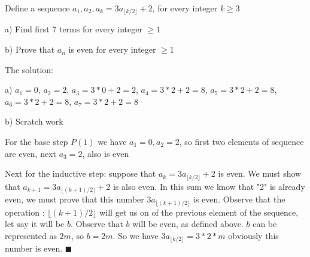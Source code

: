 \documentclass[11pt]{article}
\begin{document}
	
Define a sequence $a_1, a_2, a_k = 3a_{\lfloor k/2 \rfloor} + 2$, for every integer $k \ge 3$

a) Find first 7 terms for every integer $\ge 1$

b) Prove that $a_n$ is even for every integer $\ge 1$

The solution:

a) $a_1 = 0$, $a_2 = 2$, $a_3 = 3*0 + 2 = 2$, $a_4 = 3 * 2 + 2 = 8$, $a_5 = 3*2 + 2 = 8$,
$a_6 = 3*2 + 2 = 8$, $a_7 = 3*2 + 2 = 8$

b) Scratch work

For the base step $P(1)$ we have $a_1 = 0, a_2 = 2$, so first two elements of sequence are even, next $a_3 = 2$, also is even

Next for the inductive step: suppose that $a_k = 3a_{\lfloor k/2 \rfloor} + 2$ is even. We must show that $a_{k+1} = 3a_{\lfloor (k+1)/2 \rfloor} + 2$ is also even. In this sum we know that "2" is already even, we must prove that this number $3a_{\lfloor (k+1)/2 \rfloor} $ is even. Observe that the operation : $\lfloor (k+1)/2 \rfloor$ will get us on of the previous element of the sequence, let say it will be $b$. Observe that $b$ will be even, as defined above. $b$ can be represented as $2m$, so $b = 2m$. So we have $3a_{\lfloor k/2 \rfloor} = 3*2*m$ obviously this number is even. $\blacksquare$


	
\end{document}

